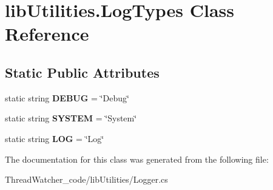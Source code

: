 \hypertarget{classlib_utilities_1_1_log_types}{\section{lib\+Utilities.\+Log\+Types Class Reference}
\label{classlib_utilities_1_1_log_types}
}
\subsection*{Static Public Attributes}
\begin{DoxyCompactItemize}
\item 
\hypertarget{classlib_utilities_1_1_log_types_a491c2a20d391a1e684163da11569f009}{static string {\bfseries D\+E\+B\+U\+G} = \char`\"{}Debug\char`\"{}}\label{classlib_utilities_1_1_log_types_a491c2a20d391a1e684163da11569f009}

\item 
\hypertarget{classlib_utilities_1_1_log_types_abf9a943422d32f30d8bdfe6d33947eb1}{static string {\bfseries S\+Y\+S\+T\+E\+M} = \char`\"{}System\char`\"{}}\label{classlib_utilities_1_1_log_types_abf9a943422d32f30d8bdfe6d33947eb1}

\item 
\hypertarget{classlib_utilities_1_1_log_types_aa212e8440779b7ce10a5476129ccaa24}{static string {\bfseries L\+O\+G} = \char`\"{}Log\char`\"{}}\label{classlib_utilities_1_1_log_types_aa212e8440779b7ce10a5476129ccaa24}

\end{DoxyCompactItemize}


The documentation for this class was generated from the following file\+:\begin{DoxyCompactItemize}
\item 
Thread\+Watcher\+\_\+code/lib\+Utilities/Logger.\+cs\end{DoxyCompactItemize}
